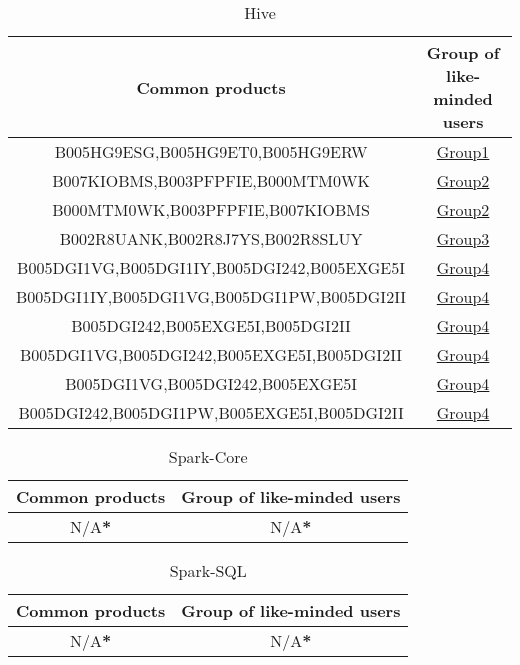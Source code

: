 \begin{itemize}
    \begin{table}[!ht]
    \centering
    \caption{Hive}
    \begin{tabular}{cc}
      \toprule
          Common products &  Group of like-minded users \\
          \midrule
          B005HG9ESG,B005HG9ET0,B005HG9ERW & \hyperlink{Group1}{Group1} \\
          B007KIOBMS,B003PFPFIE,B000MTM0WK & \hyperlink{Group2}{Group2} \\
          B000MTM0WK,B003PFPFIE,B007KIOBMS & \hyperlink{Group2}{Group2} \\
          B002R8UANK,B002R8J7YS,B002R8SLUY & \hyperlink{Group3}{Group3} \\
          B005DGI1VG,B005DGI1IY,B005DGI242,B005EXGE5I & \hyperlink{Group4}{Group4} \\
          B005DGI1IY,B005DGI1VG,B005DGI1PW,B005DGI2II & \hyperlink{Group4}{Group4} \\
          B005DGI242,B005EXGE5I,B005DGI2II & \hyperlink{Group4}{Group4} \\
          B005DGI1VG,B005DGI242,B005EXGE5I,B005DGI2II & \hyperlink{Group4}{Group4} \\
          B005DGI1VG,B005DGI242,B005EXGE5I & \hyperlink{Group4}{Group4} \\
          B005DGI242,B005DGI1PW,B005EXGE5I,B005DGI2II & \hyperlink{Group4}{Group4} \\
          \bottomrule
    \end{tabular}
  \end{table}

    \begin{table}[!h]
    \centering
    \caption{Spark-Core}
    \begin{tabular}{cc}
      \toprule
          Common products &  Group of like-minded users \\
          \midrule
          N/A\textbf{*}  & N/A\textbf{*} \\
          \bottomrule
    \end{tabular}
  \end{table}

    \begin{table}[!h]
    \centering
    \caption{Spark-SQL}
    \begin{tabular}{cc}
      \toprule
          Common products &  Group of like-minded users \\
          \midrule
          N/A\textbf{*}  & N/A\textbf{*} \\
          \bottomrule
    \end{tabular}
  \end{table}


\end{itemize}
